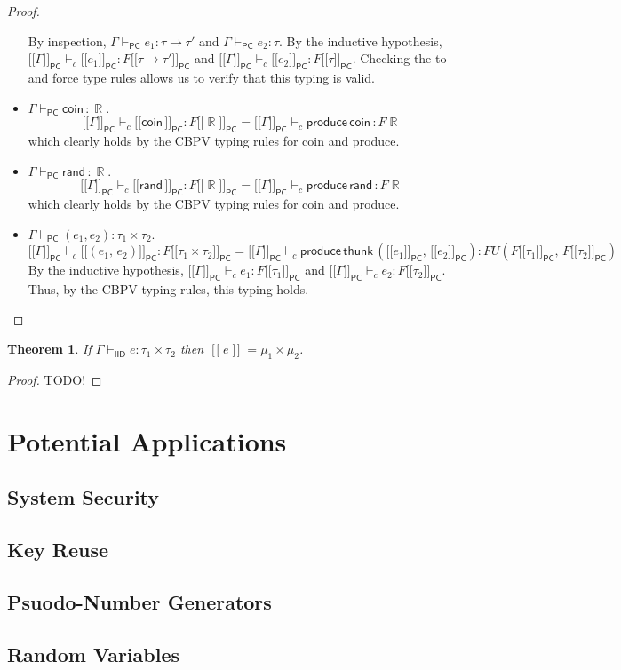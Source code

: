 \documentclass{article}
\newtheorem*{theorem}{Theorem}
\DeclareMathOperator*\R{\mathbb{R}}
\DeclareMathOperator*\llb{[\![}
\DeclareMathOperator*\rrb{]\!]}
\newcommand{\iid}{\mathsf{IID}}
\newcommand{\pc}{\mathsf{PC}}
\newcommand{\rand}{\mathsf{rand\,}}
\newcommand{\coin}{\mathsf{coin\,}}
\newcommand{\1}{\mathsf{\,\#1\,}}
\newcommand{\2}{\mathsf{\,\#2\,}}
\newcommand{\thunk}{\mathsf{thunk \,}}
\newcommand{\produce}{\mathsf{produce \,}}
\newcommand{\sempc}[1]{[\![ #1 {]\!]}_{\mathsf{PC}}}
\begin{document}
\begin{proof}
\begin{itemize}
\begin{equation*}
	\end{equation*}
	By inspection, $\Gamma \vdash_\pc e_1 : \tau \to \tau'$
	and 
	$\Gamma \vdash_\pc e_2 : \tau$. 
	By the inductive hypothesis,
	$\sempc{\Gamma} \vdash_c \sempc{e_1} : F \sempc{\tau \to \tau'}$
	and
	$\sempc{\Gamma} \vdash_c \sempc{e_2} : F \sempc{\tau}$.
	Checking the to and force type rules allows us to verify that this typing is valid.
	\item
	$\Gamma \vdash_\pc  \coin : \R$.
	\begin{equation*}
		\sempc{\Gamma} \vdash_c \sempc{\coin} : F \sempc{\R}
		=
		\sempc{\Gamma} 
		\vdash_c \produce \coin : F \R
	\end{equation*}
	which clearly holds by the CBPV typing rules for coin and produce.
	\item
	$\Gamma \vdash_\pc  \rand : \R$.
	\begin{equation*}
		\sempc{\Gamma} \vdash_c \sempc{\rand} : F \sempc{\R}
		=
		\sempc{\Gamma} 
		\vdash_c \produce \rand : F \R
	\end{equation*}
	which clearly holds by the CBPV typing rules for coin and produce.
	\item
	$\Gamma \vdash_\pc  (e_1, e_2) : \tau_1 \times \tau_2$.
	\begin{equation*}
		\sempc{\Gamma} \vdash_c \sempc{(e_1,\, e_2)}: F \sempc{\tau_1 \times \tau_2}
		=
		\sempc{\Gamma} 
		\vdash_c \produce \thunk (\sempc{e_1},\, \sempc{e_2}) : 
		F U (F \sempc{\tau_1},\, F \sempc{\tau_2})
	\end{equation*}
	By the inductive hypothesis,
	$\sempc{\Gamma} \vdash_c e_1 : F \sempc{\tau_1}$
	and
	$\sempc{\Gamma} \vdash_c e_2 : F \sempc{\tau_2}$.
	Thus, by the CBPV typing rules, this typing holds.
\end{itemize}
\end{proof}

\begin{theorem}
	If $\Gamma \vdash_{\iid} e : \tau_1 \times \tau_2$
	then $\llb e \rrb = \mu_1 \times \mu_2$.
\end{theorem}

\begin{proof}
TODO!
\end{proof}

\section{Potential Applications}
	\subsection{System Security}
	\subsection{Key Reuse}
	
	\subsection{Psuodo-Number Generators}
	
	\subsection{Random Variables}
\end{document}
